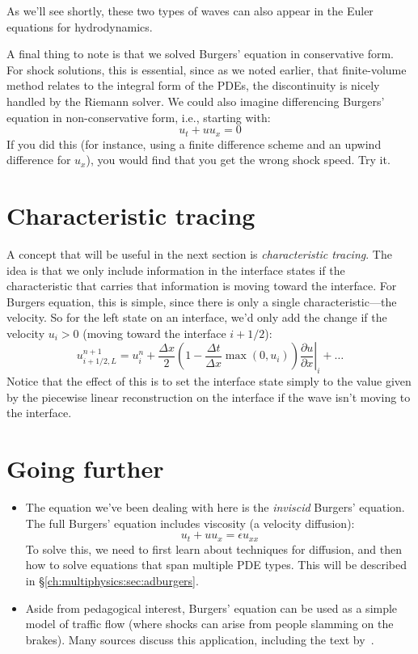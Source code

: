 As we'll see shortly, these two types of waves can also appear in the Euler equations
for hydrodynamics.

A final thing to note is that we solved Burgers' equation in conservative form.
For shock solutions, this is essential, since as we noted earlier, that finite-volume
method relates to the integral form of the PDEs, the discontinuity is nicely handled
by the Riemann solver.  We could also imagine differencing Burgers' equation in
non-conservative form, i.e., starting with:
\begin{equation}
u_t + u u_x = 0
\end{equation}
If you did this (for instance, using a finite difference scheme and an
upwind difference for $u_x$), you would find that you get the wrong
shock speed.  Try it.


\section{Characteristic tracing}

A concept that will be useful in the next section is {\em
  characteristic tracing}.  The idea is that we only include
information in the interface states if the characteristic that carries
that information is moving toward the interface.  For Burgers equation,
this is simple, since there is only a single characteristic---the velocity.
So for the left state on an interface, we'd only add the change if 
the velocity $u_i > 0$ (moving toward the interface $i+1/2$):
\begin{equation}
u^{n+1}_{i+1/2,L} 
 = u^n_i + \frac{\Delta x}{2} 
   \left ( 1 - \frac{\Delta t}{\Delta x} \max(0, u_i) \right ) 
   \left . \frac{\partial u}{\partial x} \right |_i + \ldots
\end{equation}
Notice that the effect of this is to set the interface state simply to
the value given by the piecewise linear reconstruction on the interface
if the wave isn't moving to the interface.  

\section{Going further}

\begin{itemize}
\item The equation we've been dealing with here is the {\em inviscid} Burgers' equation. 
The full Burgers' equation includes viscosity (a velocity diffusion):
\begin{equation}
u_t + u u_x = \epsilon u_{xx}
\end{equation}
To solve this, we need to first learn about techniques for diffusion, and then how to
solve equations that span multiple PDE types.  This will be described in \S \ref{ch:multiphysics:sec:adburgers}.

\item Aside from pedagogical interest, Burgers' equation can be used as a simple
model of traffic flow (where shocks can arise from people slamming on the brakes).
Many sources discuss this application, including the text by~\cite{leveque:2002}.

\end{itemize}
